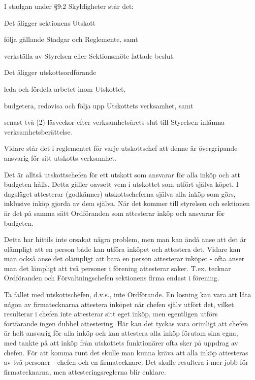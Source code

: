 \documentclass[10pt]{article}
\begin{document}
\begin{paragrafer}
I stadgan under \S9:2 Skyldigheter står det:
\begin{addmargin}[8mm]{0mm}
Det åligger sektionens Utskott
\begin{attlist}
\item följa gällande Stadgar och Reglemente, samt
\item verkställa av Styrelsen eller Sektionsmöte fattade beslut.
\end{attlist}
Det åligger utskottsordförande
\begin{attlist}
\item leda och fördela arbetet inom Utskottet,
\item budgetera, redovisa och följa upp Utskottets verksamhet, samt
\item senast två (2) läsveckor efter verksamhetsårets slut till Styrelsen
    inlämna verksamhetsberättelse.
\end{attlist}
\end{addmargin}

Vidare står det i reglementet för varje utskottschef att denne är övergripande ansvarig för sitt utskotts verksamhet.

Det är alltså utskottschefen för ett utskott som ansvarar för alla inköp och att budgeten hålls. Detta gäller oavsett vem i utskottet som utfört själva köpet. I dagsläget attesterar (godkänner) utskottscheferna själva alla inköp som görs, inklusive inköp gjorda av dem själva. När det kommer till styrelsen och sektionen är det på samma sätt Ordföranden som attesterar inköp och ansvarar för budgeten.

Detta har hittils inte orsakat några problem, men man kan ändå anse att det är olämpligt att en person både kan utföra inköpet och attestera det. Vidare kan man också anse det olämpligt att bara en person attesterar inköpet - ofta anser man det lämpligt att två personer i förening attesterar saker. T.ex. tecknar Ordföranden och Förvaltningschefen sektionens firma endast i förening.

Ta fallet med utskottschefen, d.v.s., inte Ordförande. En lösning kan vara att låta någon av firmatecknarna attestera inköpet när chefen själv utfört det, vilket resulterar i chefen inte attesterar sitt eget inköp, men egentligen utförs fortfarande ingen dubbel attestering. Här kan det tyckas vara orimligt att chefen är helt ansvarig för alla inköp och kan attestera alla inköp förutom sina egna, med tankte på att inköp från utskottets funktionärer ofta sker på uppdrag av chefen. För att komma runt det skulle man kunna kräva att alla inköp attesteras av två personer - chefen och en firmatecknare. Det skulle resultera i mer jobb för firmatecknarna, men attesteringsreglerna blir enklare.


\end{paragrafer}
\end{document}

